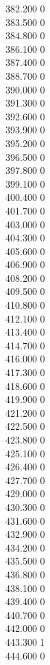 { 382.200	0 \\
 383.500	0 \\
 384.800	0 \\
 386.100	0 \\
 387.400	0 \\
 388.700	0 \\
 390.000	0 \\
 391.300	0 \\
 392.600	0 \\
 393.900	0 \\
 395.200	0 \\
 396.500	0 \\
 397.800	0 \\
 399.100	0 \\
 400.400	0 \\
 401.700	0 \\
 403.000	0 \\
 404.300	0 \\
 405.600	0 \\
 406.900	0 \\
 408.200	0 \\
 409.500	0 \\
 410.800	0 \\
 412.100	0 \\
 413.400	0 \\
 414.700	0 \\
 416.000	0 \\
 417.300	0 \\
 418.600	0 \\
 419.900	0 \\
 421.200	0 \\
 422.500	0 \\
 423.800	0 \\
 425.100	0 \\
 426.400	0 \\
 427.700	0 \\
 429.000	0 \\
 430.300	0 \\
 431.600	0 \\
 432.900	0 \\
 434.200	0 \\
 435.500	0 \\
 436.800	0 \\
 438.100	0 \\
 439.400	0 \\
 440.700	0 \\
 442.000	0 \\
 443.300	1 \\
 444.600	0 \\
}
